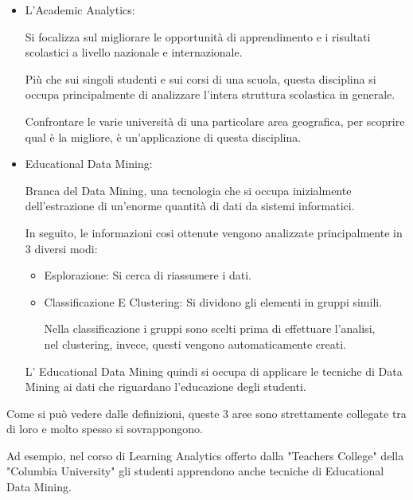 \begin{itemize}

\item L’Academic Analytics:

Si focalizza sul migliorare le opportunità di apprendimento e i risultati scolastici a livello nazionale e internazionale.

Più che sui singoli studenti e sui corsi di una scuola, questa disciplina si occupa principalmente di analizzare l'intera struttura scolastica in generale.

Confrontare le varie università di una particolare area geografica, per scoprire qual è la migliore, è un'applicazione di questa disciplina.

\cite{academicanalytics}

\item Educational Data Mining:

Branca del Data Mining, una tecnologia che si occupa inizialmente dell'estrazione di un'enorme quantità di dati da sistemi informatici.

In seguito, le informazioni cosi ottenute vengono analizzate principalmente in 3 diversi modi:

\begin{itemize}

\item Esplorazione: Si cerca di riassumere i dati.
\item Classificazione E Clustering: Si dividono gli elementi in gruppi simili.

Nella classificazione i gruppi sono scelti prima di effettuare l'analisi, \\ nel clustering, invece, questi vengono automaticamente creati.

\end{itemize}

L' Educational Data Mining quindi si occupa di applicare le tecniche di Data Mining ai dati che riguardano l'educazione degli studenti.

\cite{educationaldatamining}

\end{itemize}

Come si può vedere dalle definizioni, queste 3 aree sono strettamente collegate tra di loro e molto spesso si sovrappongono.

Ad esempio, nel corso di Learning Analytics offerto dalla "Teachers College" della "Columbia University" gli studenti apprendono anche tecniche di Educational Data Mining. \cite{columbia}

